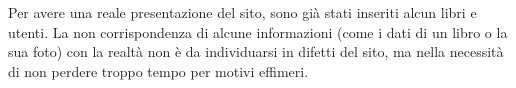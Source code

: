 Per avere una reale presentazione del sito, sono già stati inseriti alcun libri e utenti. La non corrispondenza di alcune informazioni (come i dati di un libro o la sua foto) con la realtà non è da individuarsi in difetti del sito, ma nella necessità di non perdere troppo tempo per motivi effimeri.